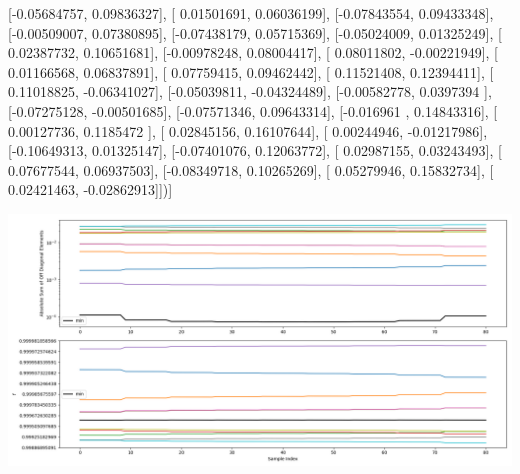 \documentclass{article}
\begin{document}
       [-0.05684757,  0.09836327],
       [ 0.01501691,  0.06036199],
       [-0.07843554,  0.09433348],
       [-0.00509007,  0.07380895],
       [-0.07438179,  0.05715369],
       [-0.05024009,  0.01325249],
       [ 0.02387732,  0.10651681],
       [-0.00978248,  0.08004417],
       [ 0.08011802, -0.00221949],
       [ 0.01166568,  0.06837891],
       [ 0.07759415,  0.09462442],
       [ 0.11521408,  0.12394411],
       [ 0.11018825, -0.06341027],
       [-0.05039811, -0.04324489],
       [-0.00582778,  0.0397394 ],
       [-0.07275128, -0.00501685],
       [-0.07571346,  0.09643314],
       [-0.016961  ,  0.14843316],
       [ 0.00127736,  0.1185472 ],
       [ 0.02845156,  0.16107644],
       [ 0.00244946, -0.01217986],
       [-0.10649313,  0.01325147],
       [-0.07401076,  0.12063772],
       [ 0.02987155,  0.03243493],
       [ 0.07677544,  0.06937503],
       [-0.08349718,  0.10265269],
       [ 0.05279946,  0.15832734],
       [ 0.02421463, -0.02862913]])]
\begin{center}
\includegraphics[scale=.9]{report_pickled_controls164/control_dpn_all.png}

\end{center}
\end{document}
